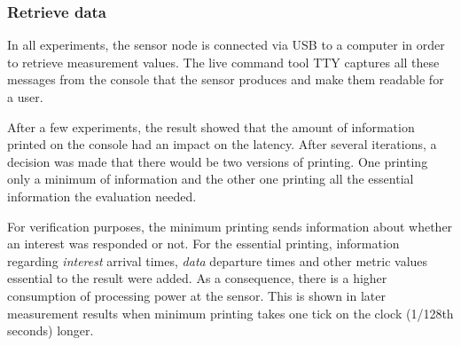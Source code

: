\subsubsection{Retrieve data}
In all experiments, the sensor node is connected via USB to a computer in order to retrieve measurement values. The live command tool TTY captures all these messages from the console that the sensor produces and make them readable for a user. 

After a few experiments, the result showed that the amount of information printed on the console had an impact on the latency.
After several iterations, a decision was made that there would be two versions of printing. One printing only a minimum of information and the other one printing all the essential information the evaluation needed. 

For verification purposes, the minimum printing sends information about whether an interest was responded or not. 
For the essential printing, information regarding \textit{interest} arrival times, \textit{data} departure times and other metric values essential to the result were added. As a consequence, there is a higher consumption of processing power at the sensor. This is shown in later measurement results when minimum printing takes one tick on the clock (1/128th seconds) longer.
